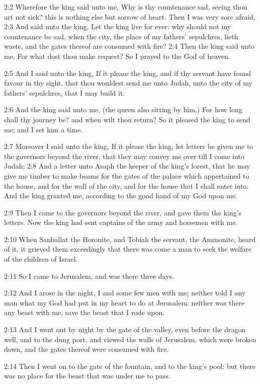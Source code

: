 2:2 Wherefore the king said unto me, Why is thy countenance sad,
seeing thou art not sick? this is nothing else but sorrow of heart.
Then I was very sore afraid, 2:3 And said unto the king, Let the king
live for ever: why should not my countenance be sad, when the city,
the place of my fathers' sepulchres, lieth waste, and the gates
thereof are consumed with fire?  2:4 Then the king said unto me, For
what dost thou make request? So I prayed to the God of heaven.

2:5 And I said unto the king, If it please the king, and if thy
servant have found favour in thy sight, that thou wouldest send me
unto Judah, unto the city of my fathers' sepulchres, that I may build
it.

2:6 And the king said unto me, (the queen also sitting by him,) For
how long shall thy journey be? and when wilt thou return? So it
pleased the king to send me; and I set him a time.

2:7 Moreover I said unto the king, If it please the king, let letters
be given me to the governors beyond the river, that they may convey me
over till I come into Judah; 2:8 And a letter unto Asaph the keeper of
the king's forest, that he may give me timber to make beams for the
gates of the palace which appertained to the house, and for the wall
of the city, and for the house that I shall enter into. And the king
granted me, according to the good hand of my God upon me.

2:9 Then I came to the governors beyond the river, and gave them the
king's letters. Now the king had sent captains of the army and
horsemen with me.

2:10 When Sanballat the Horonite, and Tobiah the servant, the
Ammonite, heard of it, it grieved them exceedingly that there was come
a man to seek the welfare of the children of Israel.

2:11 So I came to Jerusalem, and was there three days.

2:12 And I arose in the night, I and some few men with me; neither
told I any man what my God had put in my heart to do at Jerusalem:
neither was there any beast with me, save the beast that I rode upon.

2:13 And I went out by night by the gate of the valley, even before
the dragon well, and to the dung port, and viewed the walls of
Jerusalem, which were broken down, and the gates thereof were consumed
with fire.

2:14 Then I went on to the gate of the fountain, and to the king's
pool: but there was no place for the beast that was under me to pass.

